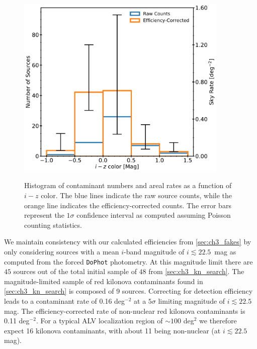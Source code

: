 \begin{figure}[!t]
\begin{center}
\hspace*{-0.1in}
\scalebox{1.}
{\includegraphics[width=0.9\textwidth]{./figs/chapter3/f8.pdf}}
\caption{\singlespace Histogram of contaminant numbers and areal rates as a function of $i-z$ color. The blue lines indicate the raw source counts, while the orange line indicates the efficiency-corrected counts. The error bars represent the $1\sigma$ confidence interval as computed assuming Poisson counting statistics.}
\label{fig:ch3_color_dist_corr}
\end{center}
\end{figure}

\clearpage
We maintain consistency with our calculated efficiencies from \cref{sec:ch3_fakes} by only considering sources with a mean $i$-band magnitude of $i \lesssim 22.5$~mag as computed from the forced {\tt DoPhot} photometry. At this magnitude limit there are $45$ sources out of the total initial sample of $48$ from \cref{sec:ch3_kn_search}. The magnitude-limited sample of red kilonova contaminants found in \cref{sec:ch3_kn_search} is composed of 9 sources. Correcting for detection efficiency leads to a contaminant rate of 0.16 deg$^{-2}$ at a $5\sigma$ limiting magnitude of $i \lesssim 22.5$ mag. The efficiency-corrected rate of non-nuclear red kilonova contaminants is 0.11 deg$^{-2}$.  For a typical ALV localization region of $\sim 100$ deg$^2$ we therefore expect 16 kilonova contaminants, with about 11 being non-nuclear (at $i\lesssim 22.5$ mag).

